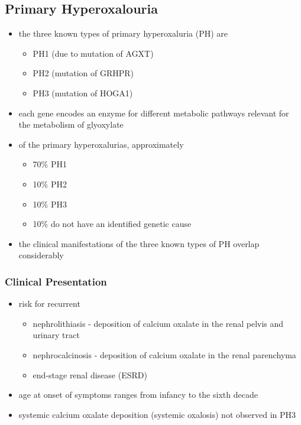 \documentclass[12pt]{scrartcl}
\begin{document}
\subsection{Primary Hyperoxalouria}
\label{sec:orgfb45201}
\begin{itemize}
\item the three known types of primary hyperoxaluria (PH) are
\begin{itemize}
\item PH1 (due to mutation of AGXT)
\item PH2 (mutation of GRHPR)
\item PH3 (mutation of HOGA1)
\end{itemize}
\item each gene encodes an enzyme for different metabolic pathways
relevant for the metabolism of glyoxylate
\item of the primary hyperoxalurias, approximately
\begin{itemize}
\item 70\% PH1
\item 10\% PH2
\item 10\% PH3
\item 10\% do not have an identified genetic cause
\end{itemize}
\item the clinical manifestations of the three known types of
PH overlap considerably
\end{itemize}
\subsubsection{Clinical Presentation}
\label{sec:orga82e835}
\begin{itemize}
\item risk for recurrent
\begin{itemize}
\item nephrolithiasis - deposition of calcium oxalate in the renal pelvis and urinary tract
\item nephrocalcinosis - deposition of calcium oxalate in the renal parenchyma
\item end-stage renal disease (ESRD)
\end{itemize}
\item age at onset of symptoms ranges from infancy to the sixth decade
\item systemic calcium oxalate deposition (systemic oxalosis) not observed in PH3
\end{itemize}
\end{document}
